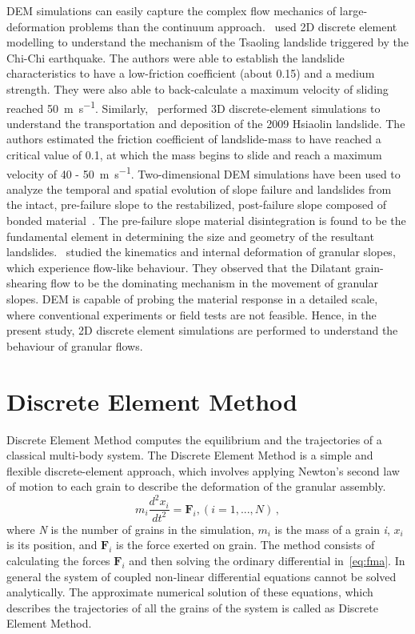 DEM simulations can easily capture the complex flow mechanics of 
large-deformation problems than the continuum approach.~\cite{Tang2009} used 2D 
discrete element modelling to understand the mechanism of the Tsaoling 
landslide triggered by the Chi-Chi earthquake. The authors were able to 
establish the landslide characteristics to have a low-friction coefficient 
(about 0.15) and a medium strength. They were also able to back-calculate a 
maximum velocity of sliding reached 50~\si{\m\per\s}. 
Similarly,~\cite{Tang2013} performed 3D discrete-element simulations to 
understand the 
transportation and deposition of the 2009 Hsiaolin landslide. The authors 
estimated the friction coefficient of landslide-mass to have reached a critical 
value of 0.1, at which the mass begins to slide and reach a maximum velocity of 
40 - 50~\si{\m\per\s}. Two-dimensional DEM simulations have been used to 
analyze the temporal and spatial evolution of slope failure and landslides from 
the intact, pre-failure slope to the restabilized, post-failure slope composed 
of bonded material~\citep{Katz2014}. The pre-failure slope material 
disintegration is found to be the fundamental element in determining the size 
and geometry of the resultant landslides.~\citet{Liu2013} studied the 
kinematics and internal deformation of granular slopes, which experience 
flow-like behaviour. They observed that the Dilatant grain-shearing flow to be 
the dominating mechanism in the movement of granular slopes. DEM is capable of 
probing the material response in a detailed scale, where conventional 
experiments or field tests are not feasible. Hence, in the present study, 2D 
discrete element simulations are performed to understand the behaviour of 
granular flows. 

 

\section{Discrete Element Method}

Discrete Element Method computes the equilibrium and the trajectories of a 
classical multi-body system. The Discrete Element Method is a simple and 
flexible discrete-element approach, which involves applying Newton's second law 
of motion to each grain to describe the deformation of the granular assembly. 
% 
\begin{equation} 
{m}_{i}\frac{{{d}^{2}}{{x}_{i}}}{d{{t}^{2}}} = {{\mathbf{F}}_{i}}, 
(i=1,...,N ) \,,
\label{eq:fma}
\end{equation}
%
where \textit{N} is the number of grains in the simulation, $m_{\mathit{i}}$ 
is the mass of a grain \textit{i}, $x_{\mathit{i}}$ is its position, and 
$\mathbf{F}_{\mathit{i}}$ is the force exerted on grain. The method consists of 
calculating the forces $\mathbf{F}_{\mathit{i}}$ and then solving 
the ordinary differential in~\cref{eq:fma}. In general the system of coupled 
non-linear differential equations cannot be solved analytically. The 
approximate numerical solution of these equations, which describes the 
trajectories of all the grains of the system is called as Discrete Element 
Method.

